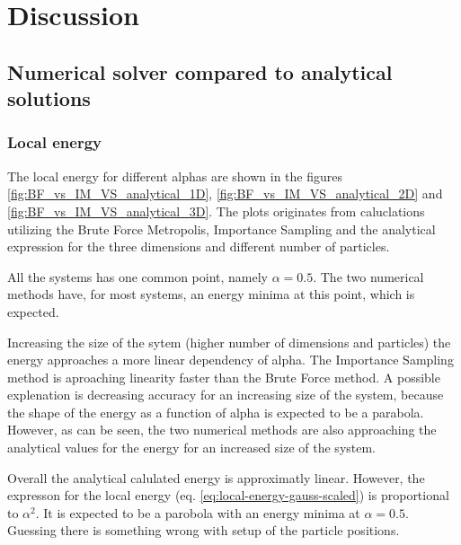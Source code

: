 \documentclass[
]{article}
\begin{document}
\hypertarget{discussion}{%
\section{Discussion}\label{discussion}}

\hypertarget{numerical-solver-compared-to-analytical-solutions}{%
\subsection*{Numerical solver compared to analytical
solutions}\label{numerical-solver-compared-to-analytical-solutions}}

\hypertarget{local-energy}{%
\subsubsection*{Local energy}\label{local-energy}}

The local energy for different alphas are shown in the figures
\ref{fig:BF_vs_IM_VS_analytical_1D}, \ref{fig:BF_vs_IM_VS_analytical_2D}
and \ref{fig:BF_vs_IM_VS_analytical_3D}. The plots originates from
caluclations utilizing the Brute Force Metropolis, Importance Sampling
and the analytical expression for the three dimensions and different
number of particles.

All the systems has one common point, namely \(\alpha = 0.5\). The two
numerical methods have, for most systems, an energy minima at this
point, which is expected.

Increasing the size of the sytem (higher number of dimensions and
particles) the energy approaches a more linear dependency of alpha. The
Importance Sampling method is aproaching linearity faster than the Brute
Force method. A possible explenation is decreasing accuracy for an
increasing size of the system, because the shape of the energy as a
function of alpha is expected to be a parabola. However, as can be seen,
the two numerical methods are also approaching the analytical values for
the energy for an increased size of the system.

Overall the analytical calulated energy is approximatly linear. However,
the expresson for the local energy (eq.
\eqref{eq:local-energy-gauss-scaled}) is proportional to \(\alpha^2\).
It is expected to be a parobola with an energy minima at
\(\alpha = 0.5\). Guessing there is something wrong with setup of the
particle positions.
\end{document}
